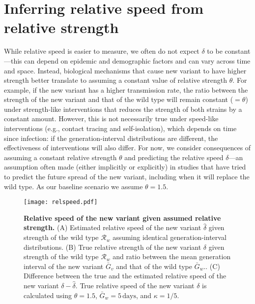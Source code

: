 \documentclass[12pt]{article}
\newcommand{\RR}{\ensuremath{{\mathcal R}}\xspace}
\begin{document}
\section{Inferring relative speed from relative strength}

While relative speed is easier to measure, we often do not expect $\delta$ to be constant---this can depend on epidemic and demographic factors and can vary across time and space.
Instead, biological mechanisms that cause new variant to have higher strength better translate to assuming a constant value of relative strength $\theta$.
For example, if the new variant has a higher transmission rate, the ratio between the strength of the new variant and that of the wild type will remain constant ($=\theta$) under strength-like interventions that reduces the strength of both strains by a constant amount.
However, this is not necessarily true under speed-like interventions (e.g., contact tracing and self-isolation), which depends on time since infection: if the generation-interval distributions are different, the effectiveness of interventions will also differ.
For now, we consider consequences of assuming a constant relative strength $\theta$ and predicting the relative speed $\delta$---an assumption often made (either implicitly or explicitly) in studies that have tried to predict the future spread of the new variant, including when it will replace the wild type.
As our baseline scenario we assume $\theta = 1.5$.

\begin{figure}[!th]
\texttt{[image: relspeed.pdf]}
\caption{
\textbf{Relative speed of the new variant given assumed relative strength.}
(A) Estimated relative speed of the new variant $\hat{\delta}$ given strength of the wild type $\RR_w$ assuming identical generation-interval distributions.
(B) True relative strength of the new variant $\delta$ given strength of the wild type $\RR_w$ and ratio between the mean generation interval of the new variant $\bar{G}_v$ and that of the wild type $\bar{G}_w$..
(C) Difference between the true and the estimated relative speed of the new variant $\delta - \hat{\delta}$.
True relative speed of the new variant $\delta$ is calculated using $\theta=1.5$, $\bar{G}_w = 5\,\textrm{days}$, and $\kappa=1/5$.
}
\label{fig:relspeed}
\end{figure}
\end{document}
